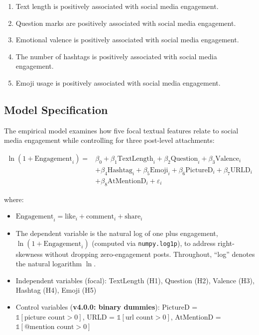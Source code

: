 \documentclass[12pt,a4paper]{article}
\begin{document}
\begin{enumerate}[label=H\arabic*.]
    \item Text length is positively associated with social media engagement.
    \item Question marks are positively associated with social media engagement.
    \item Emotional valence is positively associated with social media engagement.
    \item The number of hashtags is positively associated with social media engagement.
    \item Emoji usage is positively associated with social media engagement.
\end{enumerate}

\subsection{Model Specification}

The empirical model examines how five focal textual features relate to social media engagement while controlling for three post-level attachments:

\begin{equation}
\begin{aligned}
\ln(1 + \text{Engagement}_i) = {}& \beta_0 + \beta_1\text{TextLength}_i + \beta_2\text{Question}_i + \beta_3\text{Valence}_i \\
& + \beta_4\text{Hashtag}_i + \beta_5\text{Emoji}_i + \beta_6\text{PictureD}_i + \beta_7\text{URLD}_i \\
& + \beta_8\text{AtMentionD}_i + \varepsilon_i
\end{aligned}
\end{equation}

where:
\begin{itemize}
    \item $\text{Engagement}_i = \text{like}_i + \text{comment}_i + \text{share}_i$
    \item The dependent variable is the natural log of one plus engagement, $\ln(1 + \text{Engagement}_i)$ (computed via \texttt{numpy.log1p}), to address right-skewness without dropping zero-engagement posts. Throughout, ``log'' denotes the natural logarithm $\ln$.
    \item Independent variables (focal): TextLength (H1), Question (H2), Valence (H3), Hashtag (H4), Emoji (H5)
    \item Control variables (\textbf{v4.0.0: binary dummies}): PictureD = $\mathbb{1}[\text{picture count}>0]$, URLD = $\mathbb{1}[\text{url count}>0]$, AtMentionD = $\mathbb{1}[\text{@mention count}>0]$
\end{itemize}
\end{document}
